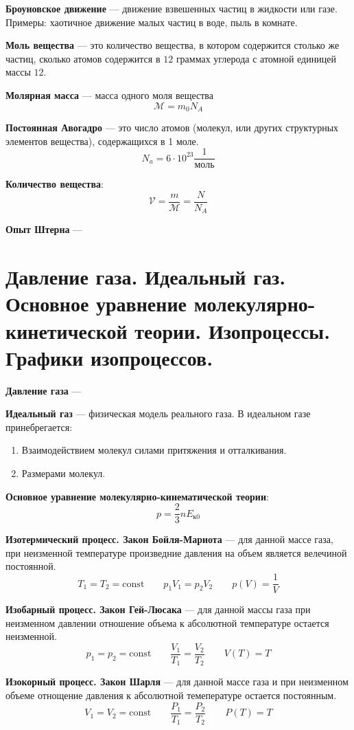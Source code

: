 \documentclass{report}
\begin{document}
{\bf Броуновское движение} ---
движение взвешенных частиц в жидкости или газе. Примеры: хаотичное движение малых частиц в воде,
пыль в комнате.

{\bf Моль вещества} ---
это количество вещества, в котором содержится столько же частиц, сколько атомов 
содержится в $12$ граммах углерода с атомной единицей массы $12$. 

{\bf Молярная масса} ---
масса одного моля вещества
$$
\mathcal{M}=m_0N_A
$$

{\bf Постоянная Авогадро} ---
это число атомов (молекул, или других структурных элементов вещества), содержащихся в 1 моле.
$$
N_a=6\cdot10^{23}\frac{1}{\textrm{моль}}
$$

{\bf Количество вещества}:
$$
\mathcal{V}=\frac{m}{\mathcal{M}}=\frac{N}{N_A}
$$

{\bf Опыт Штерна} ---



\part{Давление газа. 
Идеальный газ. 
Основное уравнение молекулярно-кинетической теории.
Изопроцессы. 
Графики изопроцессов.}

{\bf Давление газа} ---

{\bf Идеальный газ} ---
физическая модель реального газа. В идеальном газе принебрегается:
\begin{enumerate}
  \item Взаимодействием молекул силами притяжения и отталкивания.
  \item Размерами молекул.
\end{enumerate}

{\bf Основное уравнение молекулярно-кинематической теории}:
$$
p=\frac{2}{3}nE_{\textrm{к}0}
$$

{\bf Изотермический процесс. Закон Бойля-Мариота} ---
для данной массе газа, при неизменной температуре произведние давления на 
объем является велечиной постоянной.
$$
T_1=T_2=\textrm{const} \qquad 
p_1V_1=p_2V_2 \qquad 
p(V)=\frac{1}{V}
$$

{\bf Изобарный процесс. Закон Гей-Люсака} ---
для данной массы газа при неизменном давлении отношение объема к абсолютной 
температуре остается неизменной.
$$
p_1=p_2=\textrm{const} \qquad 
\frac{V_1}{T_1}=\frac{V_2}{T_2} \qquad
V(T) = T
$$

{\bf Изокорный процесс. Закон Шарля} ---
для данной массе газа и при неизменном объеме отнощение давления к абсолютной темепературе
остается постоянным.
$$
V_1=V_2=\textrm{const} \qquad 
\frac{P_1}{T_1}=\frac{P_2}{T_2} \qquad
P(T) = T
$$
\end{document}
